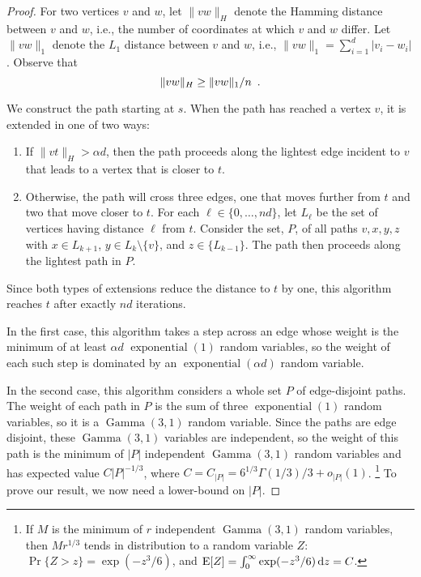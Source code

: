 \documentclass[lotsofwhite]{patmorin}
\DeclareMathOperator{\exponential}{exponential}
\DeclareMathOperator{\gammarv}{Gamma}
\begin{document}
\begin{proof}
   For two vertices
   $v$ and $w$, let $\|vw\|_H$ denote the Hamming distance between $v$ and $w$,
   i.e., the number of coordinates at which $v$ and $w$ differ.
   Let $\|vw\|_1$ denote the $L_1$ distance between $v$ and $w$, i.e., $\|vw\|_1=\sum_{i=1}^d |v_i-w_i|$.  Observe
   that 
   \begin{equation}
      \|vw\|_H \ge \|vw\|_1/n \enspace . \eqlabel{hamming-l1}
   \end{equation}

   We construct the path starting at $s$.  When the path has reached a
   vertex $v$, it is extended in one of two ways:
   \begin{enumerate}
      \item If $\|vt\|_H > \alpha d$, then the path proceeds along the
      lightest edge incident to $v$ that leads to a vertex that is closer
      to $t$.  

      \item Otherwise, the path will cross three edges, one that moves
      further from $t$ and two that move closer to $t$.  For each
      $\ell\in\{0,\ldots,nd\}$, let $L_\ell$ be the set of vertices
      having distance $\ell$ from $t$.
      Consider the set, $P$, of all paths $v,x,y,z$ with
      $x\in L_{k+1}$, $y\in L_{k}\setminus\{v\}$, and $z\in\{L_{k-1}\}$.
      The path then proceeds along the lightest path in $P$.
   \end{enumerate}
   Since both types of extensions reduce the distance to $t$ by one,
   this algorithm reaches $t$ after exactly $nd$ iterations.

   In the first case, this algorithm takes a step across an edge whose
   weight is the minimum of at least $\alpha d$ $\exponential(1)$
   random variables, so the weight of each such step is dominated by an
   $\exponential(\alpha d)$ random variable.

   In the second case, this algorithm considers a whole set $P$
   of edge-disjoint paths.  The weight of each path in $P$ is
   the sum of three $\exponential(1)$ random variables, so it is a
   $\gammarv(3,1)$ random variable.  Since the paths are edge disjoint,
   these $\gammarv(3,1)$ variables are independent, so the weight of
   this path is the minimum of $|P|$ independent $\gammarv(3,1)$ random
   variables and has expected value $C|P|^{-1/3}$, where $C = C_{|P|} =
   6^{1/3}\Gamma(1/3)/3 + o_{|P|}(1)$.%
   \footnote{If $M$ is the minimum of $r$ independent $\gammarv(3,1)$
   random variables, then $Mr^{1/3}$ tends in distribution to a random
   variable $Z$: $\Pr\{Z>z\} = \exp(-z^3/6)$, and $\mathrm{E}[Z]= \int_0^\infty
   \exp(-z^3/6)\, \mathrm{d}z = C$.}
   To prove our result,
   we now need a lower-bound on $|P|$.


\end{proof}
\end{document}
